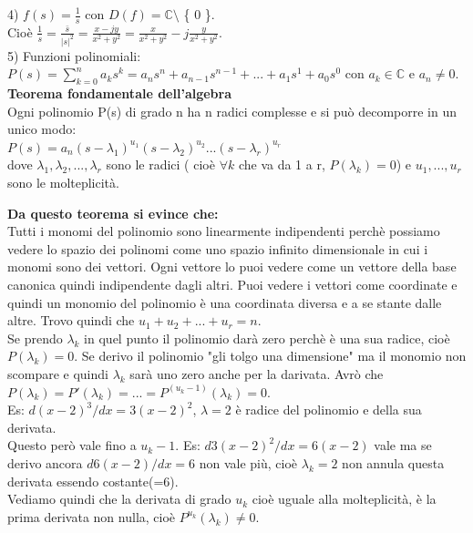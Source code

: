 4) $ f(s) = \frac{1}{s}$ con $ D(f) = \mathbb{C} \setminus$ \{ 0 \}.\\
Cioè $ \frac{1}{s} = \frac{ \bar{s} }{ |s|^{2}} = \frac{x-jy}{x^{2} + y^{2}} = \frac{ x }{ x^{2} + y^{2} } - j \frac{ y }{ x^{2} + y^{2} } $.\\

5) Funzioni polinomiali:\\
$ P(s) = \sum_{k=0}^n a_{k} s^{k} = a_{n} s^{n} + a_{n-1} s^{n-1} +...+a_{1} s^{1}+a_{0} s^{0} $ con $ a_{k} \in \mathbb{C} $ e $ a_{n} \neq 0$. \\

\textbf{Teorema fondamentale dell'algebra}\\
Ogni polinomio P(s) di grado n ha n radici complesse e si può decomporre in un unico modo:\\
$ P(s) = a_{n} (s- \lambda_{1})^{u_{1}} (s- \lambda_{2})^{u_{2}} ... (s- \lambda_{r})^{u_{r}} $ \\
dove $ \lambda_{1}, \lambda_{2},...,\lambda_{r} $ sono le radici ( cioè $ \forall k $ che va da 1 a r, $ P(\lambda_{k}) = 0$) e $ u_{1},...,u_{r} $ sono le molteplicità.\\

\pagebreak

\textbf{Da questo teorema si evince che:}\\
Tutti i monomi del polinomio sono linearmente indipendenti perchè possiamo vedere lo spazio dei polinomi come uno spazio infinito dimensionale in cui i monomi sono dei vettori. Ogni vettore lo puoi vedere come un vettore della base canonica quindi indipendente dagli altri. Puoi vedere i vettori come coordinate e quindi un monomio del polinomio è una coordinata diversa e a se stante dalle altre. Trovo quindi che $ u_{1}+u_{2}+...+u_{r} = n $.\\
Se prendo $ \lambda_{k} $ in quel punto il polinomio darà zero perchè è una sua radice, cioè $ P(\lambda_{k}) = 0 $. Se derivo il polinomio "gli tolgo una dimensione" ma il monomio non scompare e quindi $ \lambda_{k} $ sarà uno zero anche per la darivata. Avrò che $ P(\lambda_{k}) = P'(\lambda_{k}) = ... = P^{(u_{k}-1)}(\lambda_{k}) = 0 $. \\
Es: $ d(x-2)^3/dx = 3(x-2)^2 $, $ \lambda = 2 $ è radice del polinomio e della sua derivata.\\
Questo però vale fino a $ u_{k}-1 $. Es: $ d 3(x-2)^2/dx = 6(x-2) $ vale ma se derivo ancora $  d 6(x-2)/dx = 6 $ non vale più, cioè $ \lambda_{k} = 2$ non annula questa derivata essendo costante(=6). \\
Vediamo quindi che la derivata di grado $ u_{k} $ cioè uguale alla molteplicità, è la prima derivata non nulla, cioè $ P^{u_{k}}(\lambda_{k}) \neq 0 $.\\

